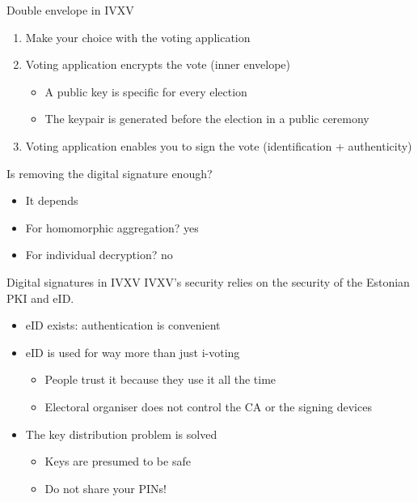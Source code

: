 \begin{frame}{Double envelope in IVXV}
  \begin{enumerate}[<+(1)->]
    \item Make your choice with the voting application
    \item Voting application encrypts the vote (inner envelope)
    \begin{itemize}
      \item A public key is specific for every election
      \item The keypair is generated before the election in a public ceremony
    \end{itemize}
    \item Voting application enables you to sign the vote (identification + authenticity)
  \end{enumerate}

  \vspace*{1em}

  \pause
  Is removing the digital signature enough?
  \begin{itemize}[<+(1)->]
    \item It depends
    \item For homomorphic aggregation? yes
    \item For individual decryption? no
  \end{itemize}
\end{frame}

\begin{frame}{Digital signatures in IVXV}
  IVXV's security relies on the security of the Estonian PKI and eID.
  \begin{itemize}[<+(1)->]
    \item eID exists: authentication is convenient
    \item eID is used for way more than just i-voting
    \begin{itemize}
      \item People trust it because they use it all the time
      \item Electoral organiser does not control the CA or the signing devices
    \end{itemize}
    \item The key distribution problem is solved
    \begin{itemize}
      \item Keys are presumed to be safe
      \item Do not share your PINs!
    \end{itemize}
  \end{itemize}
\end{frame}


